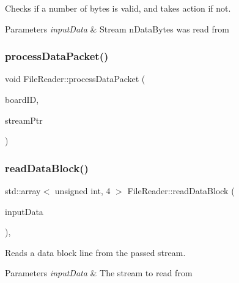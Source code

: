 Checks if a number of bytes is valid, and takes action if not. 


\begin{DoxyParams}{Parameters}
{\em input\+Data} & Stream n\+Data\+Bytes was read from \\
\hline
\end{DoxyParams}
\mbox{\label{class_file_reader_afefd5cfc826ebefa7d5ab06d6d967149}} 
\subsubsection{\texorpdfstring{process\+Data\+Packet()}{processDataPacket()}}
{\footnotesize\ttfamily void File\+Reader\+::process\+Data\+Packet (\begin{DoxyParamCaption}\item[{const \hyperlink{class_board_identifier}{Board\+Identifier} \&}]{board\+ID,  }\item[{std\+::unique\+\_\+ptr$<$ std\+::ifstream $>$ \&}]{stream\+Ptr }\end{DoxyParamCaption})\hspace{0.3cm}{\ttfamily [private]}}

\mbox{\label{class_file_reader_ac578b683eba751027766a2c30f03a28b}} 
\subsubsection{\texorpdfstring{read\+Data\+Block()}{readDataBlock()}}
{\footnotesize\ttfamily std\+::array$<$ unsigned int, 4 $>$ File\+Reader\+::read\+Data\+Block (\begin{DoxyParamCaption}\item[{std\+::unique\+\_\+ptr$<$ std\+::ifstream $>$ \&}]{input\+Data }\end{DoxyParamCaption})\hspace{0.3cm}{\ttfamily [inline]}, {\ttfamily [private]}}



Reads a data block line from the passed stream. 


\begin{DoxyParams}{Parameters}
{\em input\+Data} & The stream to read from \\
\hline
\end{DoxyParams}
\mbox{\label{class_file_reader_a94181d78b29ebacf2a4b3b3cd03a6750}} 
